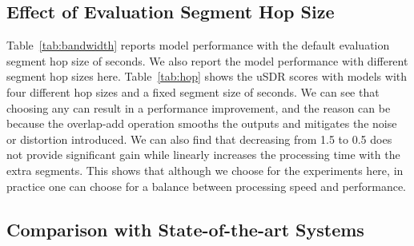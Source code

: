 \subsection{Effect of Evaluation Segment Hop Size}
\label{sec:hop}

Table~\ref{tab:bandwidth} reports model performance with the default evaluation segment hop size of  seconds. We also report the model performance with different segment hop sizes here. Table~\ref{tab:hop} shows the uSDR scores with models with four different hop sizes and a fixed segment size of  seconds. We can see that choosing any  can result in a performance improvement, and the reason can be because the overlap-add operation smooths the outputs and mitigates the noise or distortion introduced. We can also find that decreasing  from 1.5 to 0.5 does not provide significant gain while linearly increases the processing time with the extra segments. This shows that although we choose  for the experiments here, in practice one can choose  for a balance between processing speed and performance.

\subsection{Comparison with State-of-the-art Systems}

